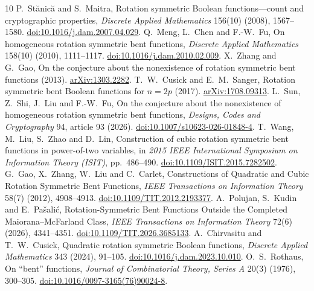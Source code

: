 \documentclass[11pt,a4paper]{article}
\theoremstyle{remark}
\theoremstyle{plain}
\begin{document}
\begin{thebibliography}{10}
 P.~St\u{a}nic\u{a} and S.~Maitra, Rotation symmetric Boolean functions---count and cryptographic properties, \emph{Discrete Applied Mathematics} 156(10) (2008), 1567--1580. \href{https://doi.org/10.1016/j.dam.2007.04.029}{doi:10.1016/j.dam.2007.04.029}.
 Q.~Meng, L.~Chen and F.-W.~Fu, On homogeneous rotation symmetric bent functions, \emph{Discrete Applied Mathematics} 158(10) (2010), 1111--1117. \href{https://doi.org/10.1016/j.dam.2010.02.009}{doi:10.1016/j.dam.2010.02.009}.
 X.~Zhang and G.~Gao, On the conjecture about the nonexistence of rotation symmetric bent functions (2013). \href{https://arxiv.org/abs/1303.2282}{arXiv:1303.2282}.
 T.~W.~Cusick and E.~M.~Sanger, Rotation symmetric bent Boolean functions for $n=2p$ (2017). \href{https://arxiv.org/abs/1708.09313}{arXiv:1708.09313}.
 L.~Sun, Z.~Shi, J.~Liu and F.-W.~Fu, On the conjecture about the nonexistence of homogeneous rotation symmetric bent functions, \emph{Designs, Codes and Cryptography} 94, article 93 (2026). \href{https://doi.org/10.1007/s10623-026-01848-4}{doi:10.1007/s10623-026-01848-4}.
 T.~Wang, M.~Liu, S.~Zhao and D.~Lin, Construction of cubic rotation symmetric bent functions in power-of-two variables, in \emph{2015 IEEE International Symposium on Information Theory (ISIT)}, pp.~486--490. \href{https://doi.org/10.1109/ISIT.2015.7282502}{doi:10.1109/ISIT.2015.7282502}.
 G.~Gao, X.~Zhang, W.~Liu and C.~Carlet, Constructions of Quadratic and Cubic Rotation Symmetric Bent Functions, \emph{IEEE Transactions on Information Theory} 58(7) (2012), 4908--4913. \href{https://doi.org/10.1109/TIT.2012.2193377}{doi:10.1109/TIT.2012.2193377}.
 A.~Polujan, S.~Kudin and E.~Pa\v{s}ali\'c, Rotation-Symmetric Bent Functions Outside the Completed Maiorana--McFarland Class, \emph{IEEE Transactions on Information Theory} 72(6) (2026), 4341--4351. \href{https://doi.org/10.1109/TIT.2026.3685133}{doi:10.1109/TIT.2026.3685133}.
 A.~Chirvasitu and T.~W.~Cusick, Quadratic rotation symmetric Boolean functions, \emph{Discrete Applied Mathematics} 343 (2024), 91--105. \href{https://doi.org/10.1016/j.dam.2023.10.010}{doi:10.1016/j.dam.2023.10.010}.
 O.~S.~Rothaus, On ``bent'' functions, \emph{Journal of Combinatorial Theory, Series A} 20(3) (1976), 300--305. \href{https://doi.org/10.1016/0097-3165(76)90024-8}{doi:10.1016/0097-3165(76)90024-8}.
\end{thebibliography}
\end{document}
